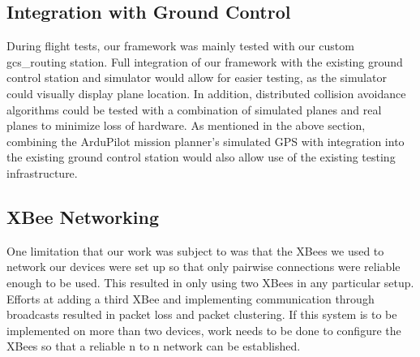\documentclass[conference]{IEEEtran}
\begin{document}
\subsection{Integration with Ground Control}
During flight tests, our framework was mainly tested with our custom gcs\_routing station. Full integration of our framework with the existing ground control station and simulator would allow for easier testing, as the simulator could visually display plane location. In addition, distributed collision avoidance algorithms could be tested with a combination of simulated planes and real planes to minimize loss of hardware. As mentioned in the above section, combining the ArduPilot mission planner’s simulated GPS with integration into the existing ground control station would also allow use of the existing testing infrastructure.

\subsection{XBee Networking}

One limitation that our work was subject to was that the XBees we used to network our devices were set up so that only pairwise connections were reliable enough to be used.  This resulted in only using two XBees in any particular setup.  Efforts at adding a third XBee and implementing communication through broadcasts resulted in packet loss and packet clustering.  If this system is to be implemented on more than two devices, work needs to be done to configure the XBees so that a reliable n to n network can be established. 


%
%
\end{document}
